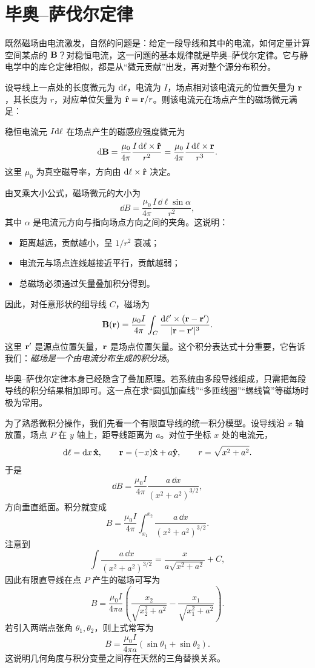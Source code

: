 \section{毕奥--萨伐尔定律}

既然磁场由电流激发，自然的问题是：给定一段导线和其中的电流，如何定量计算空间某点的 $\vb{B}$？对稳恒电流，这一问题的基本规律就是毕奥--萨伐尔定律。它与静电学中的库仑定律相似，都是从“微元贡献”出发，再对整个源分布积分。

设导线上一点处的长度微元为 $\dd\vb{\ell}$，电流为 $I$，场点相对该电流元的位置矢量为 $\vb{r}$，其长度为 $r$，对应单位矢量为 $\vu{r}=\vb{r}/r$。则该电流元在场点产生的磁场微元满足：

\begin{law}[毕奥--萨伐尔定律]
稳恒电流元 $I\dd\vb{\ell}$ 在场点产生的磁感应强度微元为
\[
  \dd\vb{B}=\frac{\mu_0}{4\pi}\frac{I\,\dd\vb{\ell}\times\vu{r}}{r^2}
  =\frac{\mu_0}{4\pi}\frac{I\,\dd\vb{\ell}\times\vb{r}}{r^3}.
\]
这里 $\mu_0$ 为真空磁导率，方向由 $\dd\vb{\ell}\times\vu{r}$ 决定。
\end{law}

由叉乘大小公式，磁场微元的大小为
\[
  \dd B=\frac{\mu_0}{4\pi}\frac{I\,\dd\ell\sin\alpha}{r^2},
\]
其中 $\alpha$ 是电流元方向与指向场点方向之间的夹角。这说明：
\begin{itemize}
  \item 距离越远，贡献越小，呈 $1/r^2$ 衰减；
  \item 电流元与场点连线越接近平行，贡献越弱；
  \item 总磁场必须通过矢量叠加积分得到。
\end{itemize}

因此，对任意形状的细导线 $C$，磁场为
\[
  \vb{B}(\vb{r})=\frac{\mu_0 I}{4\pi}\int_C \frac{\dd\vb{\ell}'\times(\vb{r}-\vb{r}')}{|\vb{r}-\vb{r}'|^3}.
\]
这里 $\vb{r}'$ 是源点位置矢量，$\vb{r}$ 是场点位置矢量。这个积分表达式十分重要，它告诉我们：\emph{磁场是一个由电流分布生成的积分场}。

\begin{remark}
毕奥--萨伐尔定律本身已经隐含了叠加原理。若系统由多段导线组成，只需把每段导线的积分结果相加即可。这一点在求“圆弧加直线”“多匝线圈”“螺线管”等磁场时极为常用。
\end{remark}

为了熟悉微积分操作，我们先看一个有限直导线的统一积分模型。设导线沿 $x$ 轴放置，场点 $P$ 在 $y$ 轴上，距导线距离为 $a$。对位于坐标 $x$ 处的电流元，
\[
  \dd\vb{\ell}=\dd x\,\vu{x},
  \qquad
  \vb{r}=(-x)\vu{x}+a\vu{y},
  \qquad
  r=\sqrt{x^2+a^2}.
\]
于是
\[
  \dd B=\frac{\mu_0 I}{4\pi}\frac{a\,\dd x}{(x^2+a^2)^{3/2}},
\]
方向垂直纸面。积分就变成
\[
  B=\frac{\mu_0 I}{4\pi}\int_{x_1}^{x_2}\frac{a\,\dd x}{(x^2+a^2)^{3/2}}.
\]
注意到
\[
  \int \frac{a\,\dd x}{(x^2+a^2)^{3/2}}=\frac{x}{a\sqrt{x^2+a^2}}+C,
\]
因此有限直导线在点 $P$ 产生的磁场可写为
\[
  B=\frac{\mu_0 I}{4\pi a}\left(\frac{x_2}{\sqrt{x_2^2+a^2}}-\frac{x_1}{\sqrt{x_1^2+a^2}}\right).
\]
若引入两端点张角 $\theta_1,\theta_2$，则上式常写为
\[
  B=\frac{\mu_0 I}{4\pi a}(\sin\theta_1+\sin\theta_2).
\]
这说明几何角度与积分变量之间存在天然的三角替换关系。

